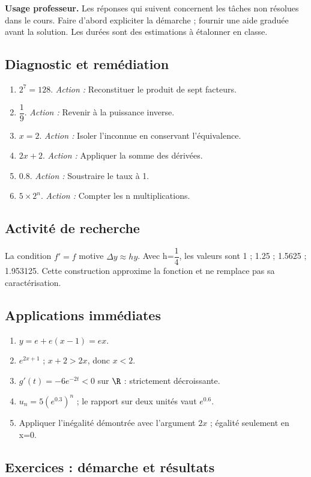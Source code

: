 \label{C09-CORR}
\textbf{Usage professeur.} Les réponses qui suivent concernent les tâches non résolues dans le cours. Faire d’abord expliciter la démarche ; fournir une aide graduée avant la solution. Les durées sont des estimations à étalonner en classe.
\subsection*{Diagnostic et remédiation}
\begin{enumerate}
\item $2^7=128$. \textit{Action :} Reconstituer le produit de sept facteurs.
\item $\dfrac{1}{9}$. \textit{Action :} Revenir à la puissance inverse.
\item $x=2$. \textit{Action :} Isoler l’inconnue en conservant l’équivalence.
\item $2x+2$. \textit{Action :} Appliquer la somme des dérivées.
\item $\num{0,8}$. \textit{Action :} Soustraire le taux à 1.
\item $5\times2^n$. \textit{Action :} Compter les n multiplications.
\end{enumerate}
\subsection*{Activité de recherche}
La condition $f\prime=f$ motive $\Delta y\approx h y$. Avec h=$\dfrac{1}{4}$, les valeurs sont 1 ; \num{1,25} ; \num{1,5625} ; \num{1,953125}. Cette construction approxime la fonction et ne remplace pas sa caractérisation.
\subsection*{Applications immédiates}
\begin{enumerate}
\item $y=e+e(x-1)=ex$.
\item $e^{2x+1}$ ; $x+2>2x$, donc $x<2$.
\item $g\prime(t)=-6e^{-2t}<0$ sur $\R$ : strictement décroissante.
\item $u_n=5(e^{\num{0,3}})^n$ ; le rapport sur deux unités vaut $e^{\num{0,6}}$.
\item Appliquer l’inégalité démontrée avec l’argument $2x$ ; égalité seulement en x=0.
\end{enumerate}
\subsection*{Exercices : démarche et résultats}

